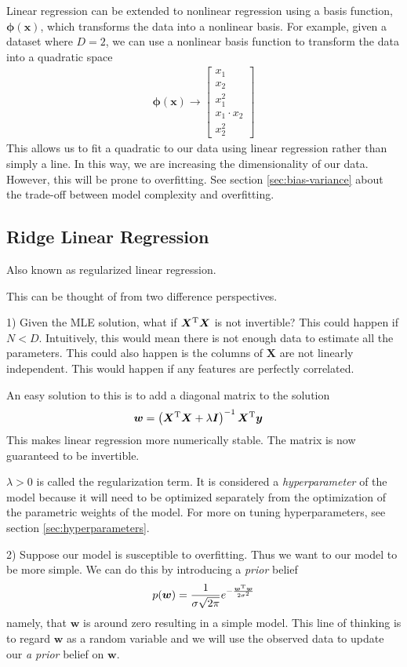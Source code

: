 \documentclass[11pt]{article}
\newcommand{\vct}[1]{\boldsymbol{#1}} %
\newcommand{\mat}[1]{\boldsymbol{#1}} %
\newcommand{\T}{^{\textrm T}} %
\begin{document}
Linear regression can be extended to nonlinear regression using a basis function, $\vct{\phi}(\vct{x})$, which transforms the data into a nonlinear basis. For example, given a dataset where $D=2$, we can use a nonlinear basis function to transform the data into a quadratic space
\begin{align*}
\vct{\phi}(\vct{x}) \to \left[ \begin{array}{c} x_1\\x_2\\x_1^2\\x_1\cdot x_2\\ x_2^2 \end{array}\right]
\end{align*}
This allows us to fit a quadratic to our data using linear regression rather than simply a line. In this way, we are increasing the dimensionality of our data. However, this will be prone to overfitting. See section \ref{sec:bias-variance} about the trade-off between model complexity and overfitting.

\subsection{Ridge Linear Regression}
Also known as regularized linear regression. 

This can be thought of from two difference perspectives.

1) Given the MLE solution, what if $\mat{X}\T\mat{X}$ is not invertible? This could happen if $N<D$. Intuitively, this would mean there is not enough data to estimate all the parameters. This could also happen is the columns of $\mat{X}$ are not linearly independent. This would happen if any features are perfectly correlated.

An easy solution to this is to add a diagonal matrix to the solution
\begin{align*}
\vct{w} &= \left( \mat{X}\T\mat{X} + \lambda \mat{I}\right)^{-1}\mat{X}\T\vct{y} 
\end{align*}
This makes linear regression more numerically stable. The matrix is now guaranteed to be invertible.

$\lambda>0$ is called the regularization term. It is considered a {\it hyperparameter} of the model because it will need to be optimized separately from the optimization of the parametric weights of the model. For more on tuning hyperparameters, see section \ref{sec:hyperparameters}.

2) Suppose our model is susceptible to overfitting. Thus we want to our model to be more simple. We can do this by introducing a {\it prior} belief
\begin{align*}
p(\vct{w}) = \frac{1}{\sigma\sqrt{2\pi}}e^{-\frac{\vct{w}\T\vct{w}}{2\sigma^2}}
\end{align*}
namely, that $\vct{w}$ is around zero resulting in a simple model. This line of thinking is to regard $\vct{w}$ as a random variable and we will use the observed data to update our {\it a prior} belief on $\vct{w}$.
\end{document}
